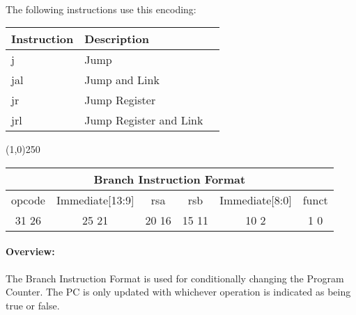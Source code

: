 \documentclass[letterpaper, 11pt]{article}
\begin{document}
\paragraph{}The following instructions use this encoding: \\
\begin{center}
	\begin{tabular}{|l|l|l|} \hline
			Instruction & Description 				\\ \hline
			j			& Jump						\\ \hline
			jal			& Jump and Link				\\ \hline
			jr			& Jump Register				\\ \hline
			jrl			& Jump Register and Link	\\ \hline


\end{tabular}
\end{center}
\begin{center}
	\line(1,0){250}
\end{center}


\begin{center}
		\begin{tabular}{|c|c|c|c|c|c|}
			\multicolumn{6}{c}{Branch Instruction Format}\\ \hline
				\hspace{2pt} opcode \hspace{2pt} & \hspace{5pt} Immediate[13:9] \hspace{5pt} &  \hspace{4pt} rsa \hspace{4pt} & \hspace{4pt}rsb  \hspace{4pt}& \hspace{10pt}Immediate[8:0]  \hspace{10pt} & \hspace{3pt} funct \hspace{3pt}   \\	\hline
			31 \hfill 26& 25 \hfill 21 &20 \hfill  16& 15 \hfill  11&10 \hfill   2&1 \hfill   0\\ \hline
		
	\end{tabular}
\end{center}
\paragraph{Overview:} The Branch Instruction Format is used for conditionally changing the Program Counter.
The PC is only updated with whichever operation is indicated as being true or false.\\
\end{document}
